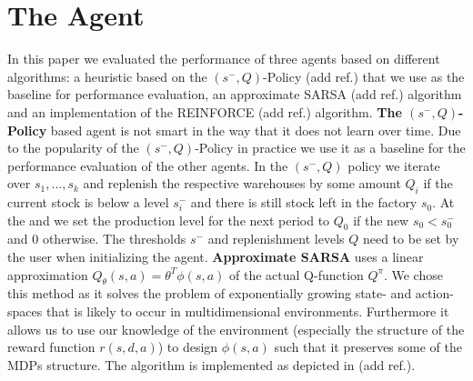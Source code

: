\documentclass[journal, a4paper]{IEEEtran}
\makeatletter
\theoremstyle{plain}
\theoremstyle{definition}
\def\BState{\State\hskip-\ALG@thistlm}
\makeatother
\begin{document}
\section{The Agent}

In this paper we evaluated the performance of three agents based on different algorithms: a heuristic based on the $(s^{-}, Q)$-Policy (add ref.) that we use as the baseline for performance evaluation, an approximate SARSA (add ref.) algorithm  and an implementation of the REINFORCE (add ref.) algorithm. \newline
\textbf{The $(s^{-}, Q)$-Policy} based agent is not smart in the way that it does not learn over time. Due to the popularity of the $(s^{-}, Q)$-Policy in practice we use it as a baseline for the performance evaluation of the other agents. In the $(s^{-}, Q)$ policy we iterate over $s_1, ..., s_k$ and replenish the respective warehouses by some amount $Q_i$ if the current stock is below a level $s_i^{-}$ and there is still stock left in the factory $s_0$. At the and we set the production level for the next period to $Q_0$ if the new $s_0 < s_0^{-}$ and $0$ otherwise. The thresholds $s^{-}$ and replenishment levels $Q$ need to be set by the user when initializing the agent.
\newline
\textbf{Approximate SARSA} uses a linear approximation $Q_{\theta}(s, a) = \theta^T \phi(s,a)$ of the actual Q-function $Q^{\pi}$. We chose this method as it solves the problem of exponentially growing state- and action- spaces that is likely to occur in multidimensional environments. Furthermore it allows us to use our knowledge of the environment (especially the structure of the reward function $r(s, d, a)$) to design $\phi(s, a)$ such that it preserves some of the MDPs structure. The algorithm is implemented as depicted in (add ref.). %
\end{document}
